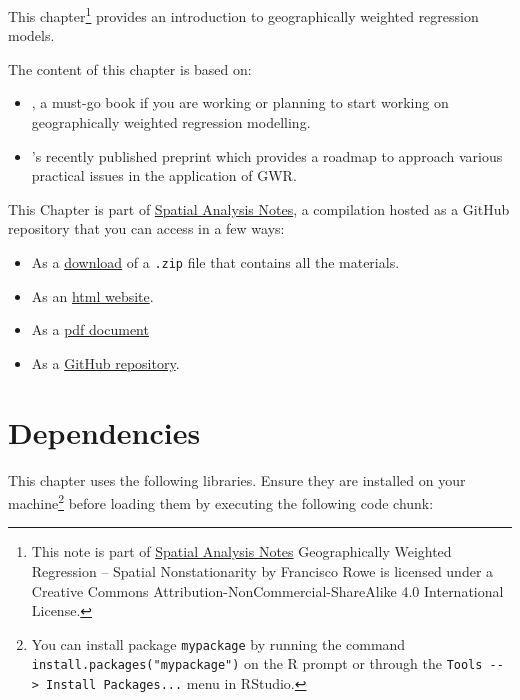 \documentclass[
]{book}
\providecommand{\tightlist}{%
  \setlength{\itemsep}{0pt}\setlength{\parskip}{0pt}}
\begin{document}
This chapter\footnote{This note is part of \href{index.html}{Spatial Analysis Notes} {Geographically Weighted Regression -- Spatial Nonstationarity} by Francisco Rowe is licensed under a Creative Commons Attribution-NonCommercial-ShareAlike 4.0 International License.} provides an introduction to geographically weighted regression models.

The content of this chapter is based on:

\begin{itemize}
\item
  \citet{Fotheringham_et_al_2002_book}, a must-go book if you are working or planning to start working on geographically weighted regression modelling.
\item
  \citet{comber2020gwr}'s recently published preprint which provides a roadmap to approach various practical issues in the application of GWR.
\end{itemize}

This Chapter is part of \href{index.html}{Spatial Analysis Notes}, a compilation hosted as a GitHub repository that you can access in a few ways:

\begin{itemize}
\tightlist
\item
  As a \href{https://github.com/GDSL-UL/san/archive/master.zip}{download} of a \texttt{.zip} file that contains all the materials.
\item
  As an \href{https://gdsl-ul.github.io/san/geographically-weighted-regression.html}{html
  website}.
\item
  As a \href{https://gdsl-ul.github.io/san/spatial_analysis_notes.pdf}{pdf
  document}
\item
  As a \href{https://github.com/GDSL-UL/san}{GitHub repository}.
\end{itemize}

\hypertarget{dependencies-6}{%
\section{Dependencies}\label{dependencies-6}}

This chapter uses the following libraries. Ensure they are installed on your machine\footnote{You can install package \texttt{mypackage} by running the command \texttt{install.packages("mypackage")} on the R prompt or through the \texttt{Tools\ -\/-\textgreater{}\ Install\ Packages...} menu in RStudio.} before loading them by executing the following code chunk:
\end{document}
